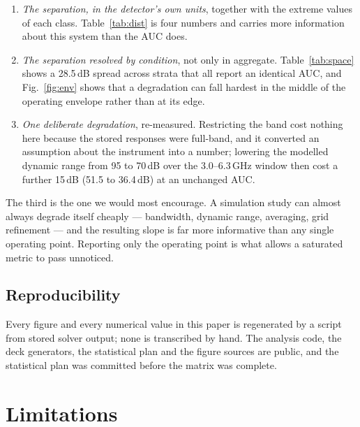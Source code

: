 \documentclass[conference]{IEEEtran}
\begin{document}
\begin{enumerate}
\item \emph{The separation, in the detector's own units}, together with the
extreme values of each class. Table~\ref{tab:dist} is four numbers and
carries more information about this system than the AUC does.
\item \emph{The separation resolved by condition}, not only in aggregate.
Table~\ref{tab:space} shows a 28.5\,dB spread across strata that all report
an identical AUC, and Fig.~\ref{fig:env} shows that a degradation can fall
hardest in the middle of the operating envelope rather than at its edge.
\item \emph{One deliberate degradation}, re-measured. Restricting the band
cost nothing here because the stored responses were full-band, and it
converted an assumption about the instrument into a number; lowering the
modelled dynamic range from 95 to 70\,dB over the 3.0--6.3\,GHz window
then cost a further 15\,dB (51.5 to 36.4\,dB) at an unchanged AUC.
\end{enumerate}

The third is the one we would most encourage. A simulation study can almost
always degrade itself cheaply --- bandwidth, dynamic range, averaging,
grid refinement --- and the resulting slope is far more informative than any
single operating point. Reporting only the operating point is what allows a
saturated metric to pass unnoticed.

\subsection{Reproducibility}
Every figure and every numerical value in this paper is regenerated by a
script from stored solver output; none is transcribed by hand. The analysis
code, the deck generators, the statistical plan and the figure sources are
public, and the statistical plan was committed before the matrix was
complete.

\section{Limitations}
\end{document}
